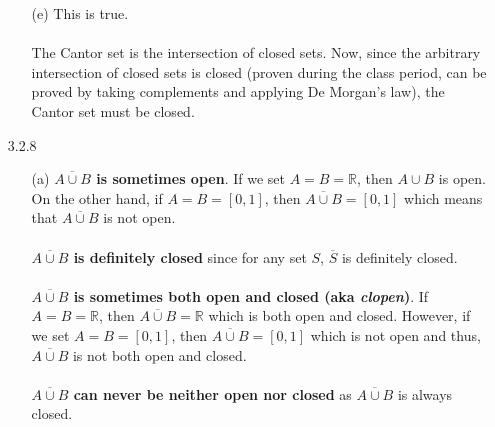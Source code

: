 \documentclass[11pt]{article}
\newcommand{\reals}{\mathbb{R}}
\begin{document}
\begin{itemize}
\begin{itemize}
            \item[(e)]
                This is true.
                \\
                \\
                The Cantor set is the intersection of closed sets. Now, since
                the arbitrary intersection of closed sets is closed (proven
                during the class period, can be proved by taking complements
                and applying De Morgan's law), the Cantor set must be closed.
        \end{itemize}

    \newpage

    \item[3.2.8]
        \begin{itemize}
            \item[(a)]
                \textbf{$\overline{A \cup B}$ is sometimes open}. If we set $A
                = B = \reals$, then $A \cup B$ is open. On the other hand, if
                $A = B = [0, 1]$, then $\overline{A \cup B} = [0, 1]$ which
                means that $\overline{A \cup B}$ is not open.
                \\
                \\
                \textbf{$\overline{A \cup B}$ is definitely closed} since for
                any set $S$, $\overline{S}$ is definitely closed.
                \\
                \\
                \textbf{$\overline{A \cup B}$ is sometimes both open and closed
                (aka \textit{clopen})}. If $A = B = \reals$, then $\overline{A
                \cup B} = \reals$ which is both open and closed. However, if we
                set $A = B = [0, 1]$, then $\overline{A \cup B} = [0, 1]$ which
                is not open and thus, $\overline{A \cup B}$ is not both open
                and closed.
                \\
                \\
                \textbf{$\overline{A \cup B}$ can never be neither open nor
                closed} as $\overline{A \cup B}$ is always closed.


\end{itemize}
\end{itemize}
\end{document}
